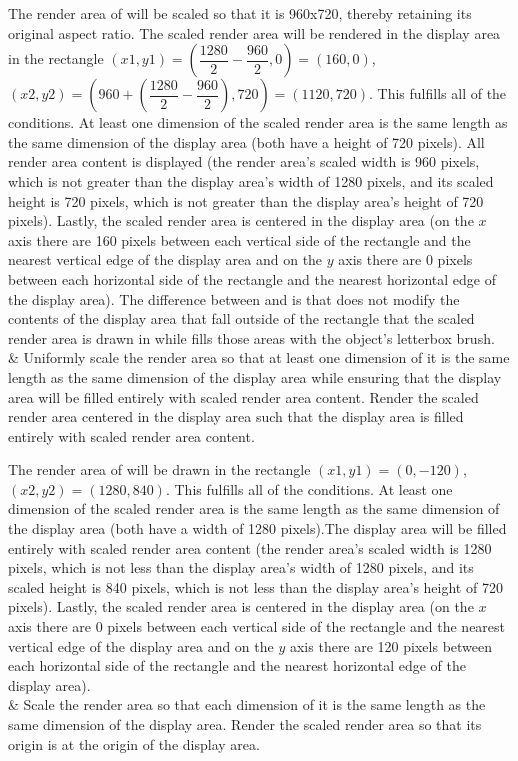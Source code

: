 \begin{libreqtab2}
 \enterexample
 The render area of  will be scaled so that it is 960x720, thereby retaining its original aspect ratio. The scaled render area will be rendered in the display area in the rectangle $(x1,y1) = (\dfrac{1280}{2} - \dfrac{960}{2},0) = (160,0)$, $(x2,y2) = (960 + (\dfrac{1280}{2} - \dfrac{960}{2}),720) = (1120,720)$. This fulfills all of the conditions. At least one dimension of the scaled render area is the same length as the same dimension of the display area (both have a height of 720 pixels). All render area content is displayed (the render area's scaled width is 960 pixels, which is not greater than the display area's width of 1280 pixels, and its scaled height is 720 pixels, which is not greater than the display area's height of 720 pixels). Lastly, the scaled render area is centered in the display area (on the $x$ axis there are 160 pixels between each vertical side of the rectangle and the nearest vertical edge of the display area and on the $y$ axis there are 0 pixels between each horizontal side of the rectangle and the nearest horizontal edge of the display area).
 \exitexample
 \enternote
 The difference between  and  is that  does not modify the contents of the display area that fall outside of the rectangle that the scaled render area is drawn in while  fills those areas with the  object's letterbox brush.
 \exitnote
 \\
 & Uniformly scale the render area so that at least one dimension of it is the same length as the same dimension of the display area while ensuring that the display area will be filled entirely with scaled render area content. Render the scaled render area centered in the display area such that the display area is filled entirely with scaled render area content.
 
 \enterexample
 The render area of  will be drawn in the rectangle $(x1,y1) = (0,-120)$, $(x2,y2) = (1280,840)$. This fulfills all of the conditions. At least one dimension of the scaled render area is the same length as the same dimension of the display area (both have a width of 1280 pixels).The display area will be filled entirely with scaled render area content (the render area's scaled width is 1280 pixels, which is not less than the display area's width of 1280 pixels, and its scaled height is 840 pixels, which is not less than the display area's height of 720 pixels). Lastly, the scaled render area is centered in the display area (on the $x$ axis there are 0 pixels between each vertical side of the rectangle and the nearest vertical edge of the display area and on the $y$ axis there are 120 pixels between each horizontal side of the rectangle and the nearest horizontal edge of the display area).
 \exitexample 
 \\
 & Scale the render area so that each dimension of it is the same length as the same dimension of the display area. Render the scaled render area so that its origin is at the origin of the display area.
 

\end{libreqtab2}
